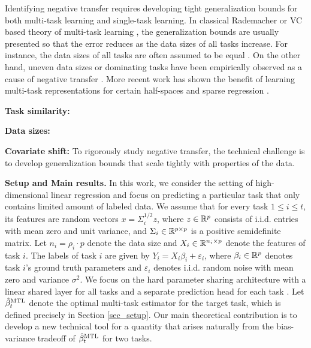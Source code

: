 Identifying negative transfer requires developing tight generalization bounds for both multi-task learning and single-task learning.
In classical Rademacher or VC based theory of multi-task learning \cite{B00,AZ05,M06}, the generalization bounds are usually presented so that the error reduces as the data sizes of all tasks increase.
For instance, the data sizes of all tasks are often assumed to be equal \cite{B00}.
On the other hand, uneven data sizes or dominating tasks have been empirically observed as a cause of negative transfer \cite{YKGLHF20}.
More recent work has shown the benefit of learning multi-task representations for certain half-spaces \cite{MPR16} and sparse regression \cite{LPTV09,LPVT11}.
\squishlist
	\item \textbf{Task similarity:}
	\item \textbf{Data sizes:}
	\item \textbf{Covariate shift:}
\squishend
To rigorously study negative transfer, the technical challenge is to develop generalization bounds that scale tightly with properties of the data.


\textbf{Setup and Main results.}
In this work, we consider the setting of high-dimensional linear regression \cite{HMRT19,BLLT20} and focus on predicting a particular task that only contains limited amount of labeled data.
We assume that for every task $1\le i\le t$, its features are random vectors $x = \Sigma_i^{1/2}z$, where $z\in\mathbb{R}^p$ consists of i.i.d. entries with mean zero and unit variance, and $\Sigma_i\in\mathbb{R}^{p\times p}$ is a positive semidefinite matrix.
Let $n_i = \rho_i \cdot p$ denote the data size and $X_i\in\mathbb{R}^{n_i\times p}$ denote the features of task $i$.
The labels of task $i$ are given by $Y_i = X_i\beta_i + \varepsilon_i$, where $\beta_i\in\mathbb{R}^p$ denotes task $i$'s ground truth parameters and $\varepsilon_i$ denotes i.i.d. random noise with mean zero and variance $\sigma^2$.
We focus on the hard parameter sharing architecture with a linear shared layer for all tasks and a separate prediction head for each task \cite{R17,MTDNN19,WZR20}.
Let $\hat{\beta}_t^{\text{MTL}}$ denote the optimal multi-task estimator for the target task, which is defined precisely in Section \ref{sec_setup}.
Our main theoretical contribution is to develop a new technical tool for a quantity that arises naturally from the bias-variance tradeoff of $\hat{\beta}_t^{\text{MTL}}$ for two tasks.

